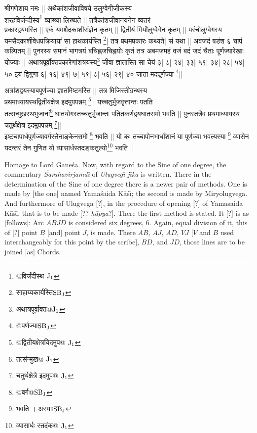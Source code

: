 \documentclass[11pt,a5paper]{book}
\def\Ganesa{Ga\-\*ne\-\'sa}
\begin{document}
{\s  
श्रीगणेशाय नमः || 
अथैकांशजीवाविषये
उलुग्वेगीजीकस्य \\
शरहविर्जन्दीस्य\footnote{{\s @विर्जंदीस्थ }${\rm J_1}$}
व्याख्या लिख्यते ||
तत्रैकांशजी\-वान\-यनेन व्यतरं \\प्रकारद्वयमस्ति ||
एकं यमशैदकाशीसंज्ञेन कृतम् ||
द्वितीयं मिर्योलुग्वेगेन कृतम् ||
परंचोलुग्वेगस्य यमसैदकाशीवेधप्रक्रियायां
सा हाथकार्यस्ति \footnote{{\s साहाय्यकार्यस्ति}${\rm SB_J}$}|
तत्र प्रथमप्रकारः कथ्यते| सं यथा ||
अवजदं षडंश ६ चापं कल्पितम् ||
पुनरस्य समानं भागत्रयं बचिह्नजचिह्नयोः कृतं
तत्र अबमजमहं वजं बदं जदं चैताः पूर्णज्यारेखाः
योज्याः ||
अथात्रपूर्वोक्तप्रकारेणांशत्रयस्य\footnote{{\s अथात्रपूर्वाक्त@}${\rm J_1}$}
जीवा ज्ञातास्ति सा चेयं ३| ८| २४| ३३| ५९| ३४| २८| ५४| ५०
इयं द्विगुणा ६| १६| ४९| ७| ५९| ८| ५६| २९| ४० जाता मदपूर्णज्या \footnote{{\s @पर्णज्या}${\rm SB_J}$}||

अत्रांशद्वयस्याबपूर्णज्या ज्ञातमिष्टमस्ति ||
तत्र मिजिस्तीग्रन्थस्य \\
प्रथमाध्यायस्थद्वितीयक्षेत्र
इदमुपपन्नम् \footnote{{\s @द्वितीयक्षेत्रयिदमुप@ }${\rm J_1}$}||
यच्चतुर्भुजवृत्तान्तः पतति \\
तत्सन्मुखस्थभुजानां\footnote{{\s तत्संन्मुख@ } ${\rm J_1}$}
घातयोगस्तच्चतुर्भुजान्तः पतितकर्णद्वयघातसमो भवति ||
पुनस्तत्रैव प्रथमाध्यायस्य
चतुर्थक्षेत्र इदमुपपन्नम् \footnote{{\s चतुर्थक्षेत्रे इदमुप@ }${\rm J_1}$}|| \\
इष्टचापार्धपूर्णज्यावर्गस्तेनाङ्केनसमो \footnote{{\s @बर्ग@}${\rm SB_J}$} भवति ||
यो कः %
 तच्चापोनभार्धांशानं या पूर्णज्या भवत्यस्या \footnote{{\s भवति । अस्याः}${\rm SB_J}$}
व्यासेन यदन्तरं तेन गुणित यो
व्यासार्धस्तदङ्कतुल्यो\footnote{{\s व्यासार्धः स्तदंक@ }${\rm J_1}$}
भवति ||}


\newpage

Homage to Lord \Ganesa.  Now, with regard to the Sine of one degree, the commentary
\textit{\'Sarahavirja\*md\={\i}} of \textit{Ulugveg\={\i} j\={\i}ka} is written.
There in the determination of the Sine of one degree there is a newer pair of methods. 
One is made by [the one] named Yama\'saida K\=a\'s\={\i}; the second is made by
Miryolugvega. And furthermore of Ulugvega [?], in the procedure of opening [?]
of Yamasaida K\=a\'s\={\i}, that is to be made [?? \textit{h\=apya}?].
There the first method is stated. It [?] is as [follows]: Arc $ABJD$ is considered six degrees, 6. Again, equal division of it, this of [?]
point $B$ [and] point $J$, is made. There $AB$, $AJ$, $AD$, $VJ$ [$V$ and $B$ used
interchangeably for this point by the scribe], $BD$, and $JD$,
those lines are to be joined [as] Chords. 
\end{document}
